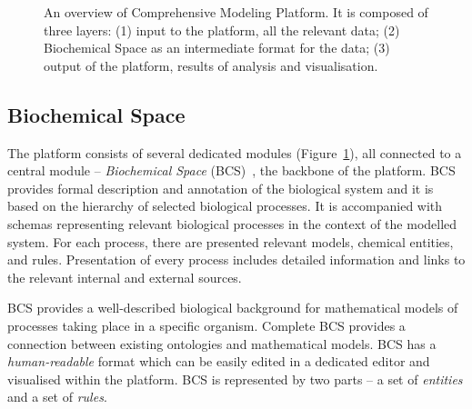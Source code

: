 \documentclass[12pt, twoside]{fithesis2} %
\begin{document}
\begin{figure}[!h]
\begin{center}
\end{center}
\caption{An overview of Comprehensive Modeling Platform. It is composed of three layers: (1) input to the platform, all the relevant data; (2) Biochemical Space as an intermediate format for the data; (3) output of the platform, results of analysis and visualisation.}\label{cmp_overview}
\end{figure}

\subsection{Biochemical Space}
\label{bcs_general}

The platform consists of several dedicated modules (Figure~\ref{cmp_overview}), all connected to a central module -- \emph{Biochemical Space} (BCS)~\cite{BCS}, the backbone of the platform. BCS provides formal description and annotation of the biological system and it is based on the hierarchy of selected biological processes. It is accompanied with schemas representing relevant biological processes in the context of the modelled system. For each process, there are presented relevant models, chemical entities, and rules. Presentation of every process includes detailed information and links to the relevant internal and external sources.

BCS provides a well-described biological background for mathematical models of processes taking place in a specific organism. Complete BCS provides a connection between existing ontologies and mathematical models. BCS has a \emph{human-readable} format which can be easily edited in a dedicated editor and visualised within the platform. BCS is represented by two parts -- a set of \emph{entities} and a set of \emph{rules}.
\end{document}
